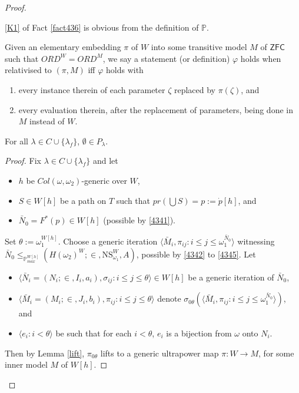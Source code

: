 \documentclass[12pt]{article}
\numberwithin{equation}{section}
\begin{document}
\begin{proof}
\begin{rem}\label{rem447}
\ref{K1} of Fact \ref{fact436} is obvious from the definition of $\mathbb{P}$.
\end{rem}

\begin{con}
Given an elementary embedding $\pi$ of $W$ into some transitive model $M$ of $\mathsf{ZFC}$ such that $ORD^W = ORD^M$, we say a statement (or definition) $\varphi$ holds when relativised to $(\pi, M)$ iff $\varphi$ holds with
\begin{enumerate}[label=(\alph*)]
    \item every instance therein of each parameter $\zeta$ replaced by $\pi(\zeta)$, and
    \item every evaluation therein, after the replacement of parameters, being done in $M$ instead of $W$.
\end{enumerate}
\end{con}

\begin{lem}\label{nonemp2}
For all $\lambda \in C \cup \{\lambda_f\}$, $\emptyset \in P_{\lambda}$.
\end{lem}

\begin{proof}
Fix $\lambda \in C \cup \{\lambda_f\}$ and let 
\begin{itemize}
    \item $h$ be $Col(\omega, \omega_2)$-generic over $W$,
    \item $S \in W[h]$ be a path on $T$ such that $pr(\bigcup S) = p := \dot{p}[h]$, and
    \item $\bar{N}_0 = F^*(p) \in W[h]$ (possible by \ref{4341}).
\end{itemize}
Set $\theta := \omega_1^{W[h]}$. Choose a generic iteration $\langle \bar{M}_i, \pi_{ij} : i \leq j \leq \omega_1^{\bar{N}_0} \rangle$ witnessing $\bar{N}_0 \leq_{\mathbb{P}^{W[h]}_{max}} (H(\omega_2)^W; \in, \mathrm{NS}_{\omega_1}^W, A)$, possible by \ref{4342} to \ref{4345}. Let 
\begin{itemize}
    \item $\langle \bar{N}_i = (N_i; \in, I_i, a_i), \sigma_{ij} : i \leq j \leq \theta \rangle \in W[h]$ be a generic iteration of $\bar{N}_0$,
    \item $\langle \bar{M}_i = (M_i; \in, J_i, b_i), \pi_{ij} : i \leq j \leq \theta \rangle$ denote $\sigma_{0\theta}(\langle \bar{M}_i, \pi_{ij} : i \leq j \leq \omega_1^{\bar{N}_0} \rangle)$, and
    \item $\langle e_i : i < \theta \rangle$ be such that for each $i < \theta$, $e_i$ is a bijection from $\omega$ onto $N_i$.
\end{itemize}
Then by Lemma \ref{lift}, $\pi_{0\theta}$ lifts to a generic ultrapower map $\pi : W \longrightarrow M$, for some inner model $M$ of $W[h]$. 


\end{proof}
\end{proof}
\end{document}
